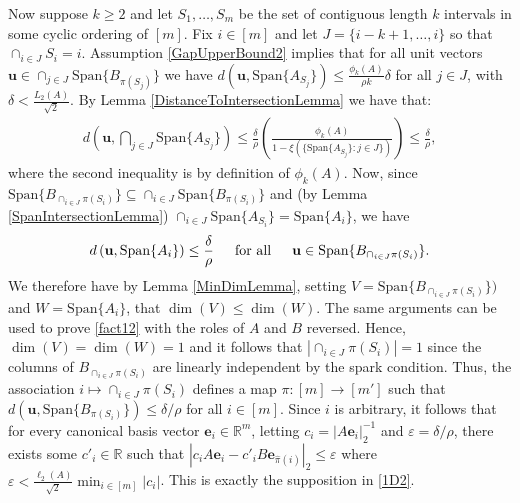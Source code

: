 \documentclass[journal, onecolumn]{IEEEtran}
\begin{document}

Now suppose $k \geq 2$ and let $S_1, \ldots, S_m$ be the set of contiguous length $k$ intervals in some cyclic ordering of $[m]$. Fix $i \in [m]$ and let $J = \{i-k+1, \ldots, i\}$ so that $\cap_{i \in J} S_i = i$. Assumption \eqref{GapUpperBound2} implies that for all unit vectors $\mathbf{u} \in \cap_{j \in J} \text{Span}\{B_{\pi(S_j)}\}$ we have $d(\mathbf{u}, \text{Span}\{A_{S_j}\}) \leq \frac{\phi_k(A)}{\rho k} \delta$ for all $j \in J$, with $\delta < \frac{L_2(A)}{\sqrt{2}}$. By Lemma \ref{DistanceToIntersectionLemma} we have that:
\begin{align}\label{sym2}
d\left( \mathbf{u}, \bigcap_{j \in J} \text{Span}\{A_{S_j}\} \right) 
\leq \frac{\delta}{\rho} \left( \frac{\phi_k(A)}{1 - \xi(\{ \text{Span}\{A_{S_j}\} : j \in J \})} \right) \leq \frac{\delta}{\rho},
\end{align}
%
where the second inequality is by definition of $\phi_k(A)$. Now, since $\text{Span}\{B_{\cap_{i \in J}\pi(S_i)}\} \subseteq \cap_{i \in J} \text{Span}\{B_{\pi(S_i)}\}$ and (by Lemma \ref{SpanIntersectionLemma}) $\cap_{i \in J}  \text{Span}\{A_{S_i}\} = \text{Span}\{A_i\}$, we have
\begin{align}\label{fact12}
d\left( \mathbf{u}, \text{Span}\{A_i\} \right) \leq \frac{\delta}{\rho} \indent \text{for all} \indent \mathbf{u} \in \text{Span}\{B_{\cap_{i \in J}\pi(S_i)}\}.
\end{align}
We therefore have by Lemma \ref{MinDimLemma}, setting $V = \text{Span}\{B_{\cap_{i \in J}\pi(S_i)}\})$ and $W = \text{Span}\{A_i\}$, that $\dim(V) \leq \dim(W)$. The same arguments can be used to prove \eqref{fact12} with the roles of $A$ and $B$ reversed. Hence, $\dim(V) = \dim(W) = 1$ and it follows that $|\cap_{i \in J} \pi(S_i)| = 1$ since the columns of $B_{\cap_{i \in J} \pi(S_i)}$ are linearly independent by the spark condition. Thus, the association $i \mapsto \cap_{i \in J} \pi(S_i)$ defines a map $\pi: [m] \to [m']$ such that $d\left( \mathbf{u}, \text{Span}\{B_{ \pi(S_i)}\}\right) \leq \delta/\rho$ for all $i \in [m]$.
Since $i$ is arbitrary, it follows that for every canonical basis vector $\mathbf{e}_i \in \mathbb{R}^m$, letting $c_i = |A\mathbf{e}_i|_2^{-1}$ and $\varepsilon = \delta/\rho$, there exists some $c'_i \in \mathbb{R}$ such that $|c_iA\mathbf{e}_i - c'_iB\mathbf{e}_{\hat \pi(i)}|_2 \leq \varepsilon$ where $\varepsilon < \frac{\ell_2(A)}{\sqrt{2}} \min_{i \in [m]} |c_i|$. This is exactly the supposition in \eqref{1D2}.
\end{document}
